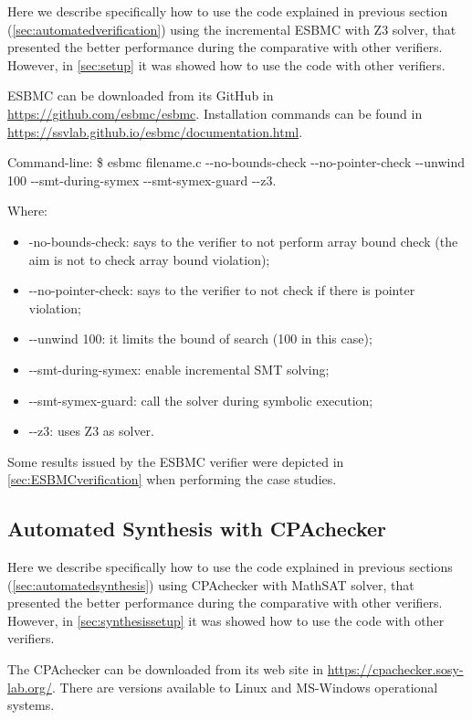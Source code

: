 Here we describe specifically how to use the code explained in previous section (\ref{sec:automatedverification}) using the incremental ESBMC with Z3 solver, that presented the better performance during the comparative with other verifiers. However, in \ref{sec:setup} it was showed how to use the code with other verifiers.

ESBMC can be downloaded from its GitHub in \url{https://github.com/esbmc/esbmc}. Installation commands can be found in \url{https://ssvlab.github.io/esbmc/documentation.html}.

Command-line: \$ esbmc filename.c -\phantom{}-no-bounds-check -\phantom{}-no-pointer-check -\phantom{}-unwind 100 -\phantom{}-smt-during-symex -\phantom{}-smt-symex-guard -\phantom{}-z3.

Where:
\begin{itemize}
\item -no-bounds-check: says to the verifier to not perform array bound check (the aim is not to check array bound violation);
\item -\phantom{}-no-pointer-check: says to the verifier to not check if there is pointer violation;
\item -\phantom{}-unwind 100: it limits the bound of search (100 in this case);
\item -\phantom{}-smt-during-symex: enable incremental SMT solving;
\item -\phantom{}-smt-symex-guard: call the solver during symbolic execution;
\item -\phantom{}-z3: uses Z3 as solver.
\end{itemize}

Some results issued by the ESBMC verifier were depicted in \ref{sec:ESBMCverification} when performing the case studies.


\subsection{Automated Synthesis with CPAchecker}

Here we describe specifically how to use the code explained in previous sections (\ref{sec:automatedsynthesis}) using CPAchecker with MathSAT solver, that presented the better performance during the comparative with other verifiers. However, in \ref{sec:synthesissetup} it was showed how to use the code with other verifiers.

The CPAchecker can be downloaded from its web site in \url{https://cpachecker.sosy-lab.org/}. There are versions available to Linux and MS-Windows operational systems.

